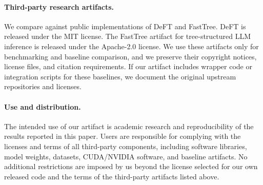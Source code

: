 \documentclass[11pt]{article}
\begin{document}
\paragraph{Third-party research artifacts.}
We compare against public implementations of DeFT and FastTree. DeFT is released
under the MIT license. The FastTree artifact for tree-structured LLM inference
is released under the Apache-2.0 license. We use these artifacts only for
benchmarking and baseline comparison, and we preserve their copyright notices,
license files, and citation requirements. If our artifact includes wrapper code
or integration scripts for these baselines, we document the original upstream
repositories and licenses.

\paragraph{Use and distribution.}
The intended use of our artifact is academic research and reproducibility of the
results reported in this paper. Users are responsible for complying with the
licenses and terms of all third-party components, including software libraries,
model weights, datasets, CUDA/NVIDIA software, and baseline artifacts. No
additional restrictions are imposed by us beyond the license selected for our
own released code and the terms of the third-party artifacts listed above.
\end{document}
